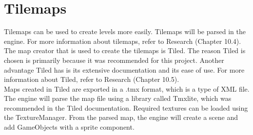 \section{Tilemaps}
\label{sec:tilemaps}
Tilemaps can be used to create levels more easily.
Tilemaps will be parsed in the engine.
For more information about tilemaps, refer to Research (Chapter 10.4).
\\
The map creator that is used to create the tilemaps is Tiled.
The reason Tiled is chosen is primarily because it was recommended for this project.
Another advantage Tiled has is its extensive documentation and its ease of use.
For more information about Tiled, refer to Research (Chapter 10.5).
\\
Maps created in Tiled are exported in a .tmx format, which is a type of XML file.
The engine will parse the map file using a library called Tmxlite, which was recommended in the Tiled documentation.
Required textures can be loaded using the TextureManager.
From the parsed map, the engine will create a scene and add GameObjects with a sprite component.